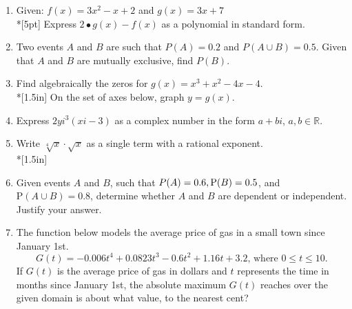 \documentclass[12pt, oneside]{article}
\begin{document}
\begin{enumerate}
\item Given: $f(x)=3x^2- x + 2$ and $g(x)=3x+7$\\*[5pt]
Express $2 \bullet g(x) - f(x)$ as a polynomial in standard form. \\[3in] %


\newpage
\item Two events $A$ and $B$ are such that $P(A)=0.2$ and $P(A \cup B) =0.5$. Given that $A$ and $B$ are mutually exclusive, find $P(B)$.\\[1.5in]

\item Find algebraically the zeros for  $g(x)=x^3+x^2-4x-4$.\\*[1.5in]
On the set of axes below, graph $y=g(x)$.
\begin{center}
\end{center} %


\newpage
\item Express $2yi^3(xi-3)$ as a complex number in the form $a+bi$, $a,b \in \mathbb{R}$. \\[1.5in]

\item Write $\sqrt[4]x \cdot \sqrt{x}$ as a single term with a rational exponent. %
\\*[1.5in]

\item Given events $A$ and $B$, such that $\mathrm \mathrm P(A)=0.6, \mathrm P(B)=0.5$, and $\mathrm P(A \cup B) =0.8$, determine whether $A$ and $B$ are dependent or independent. Justify your answer.\\[1.5in]

\item The function below models the average price of gas in a small town since January 1st.
\[G(t)=-0.006t^4 + 0.0823t^3 - 0.6t^2 +1.16t+3.2 \text{, where } 0 \leq t \leq 10.\]
If $G(t)$ is the average price of gas in dollars and $t$ represents the time in months since January 1st, the absolute maximum $G(t)$ reaches over the given domain is about what value, to the nearest cent? %


\end{enumerate}
\end{document}
